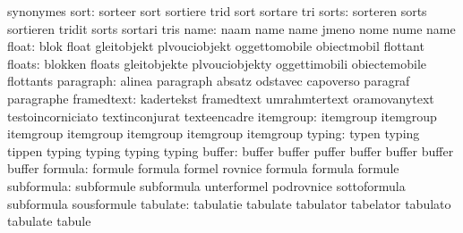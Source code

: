                            synonymes
                     sort: sorteer                   sort
                           sortiere                  trid
                           sort                      sortare
                           tri
                    sorts: sorteren                  sorts
                           sortieren                 tridit
                           sorts                     sortari
                           tris
                     name: naam                      name
                           name                      jmeno
                           nome                      nume
                           name
                    float: blok                      float
                           gleitobjekt               plvouciobjekt
                           oggettomobile             obiectmobil
                           flottant
                   floats: blokken                   floats
                           gleitobjekte              plvouciobjekty
                           oggettimobili             obiectemobile
                           flottants
                paragraph: alinea                    paragraph
                           absatz                    odstavec
                           capoverso                 paragraf
                           paragraphe
               framedtext: kadertekst                framedtext
                           umrahmtertext             oramovanytext
                           testoincorniciato         textinconjurat
                           texteencadre
                itemgroup: itemgroup                 itemgroup
                           itemgroup                 itemgroup
                           itemgroup                 itemgroup
                           itemgroup
                   typing: typen                     typing
                           tippen                    typing
                           typing                    typing
                           typing
                   buffer: buffer                    buffer
                           puffer                    buffer
                           buffer                    buffer
                           buffer
                  formula: formule                   formula
                           formel                    rovnice
                           formula                   formula
                           formule
               subformula: subformule                subformula
                           unterformel               podrovnice
                           sottoformula              subformula
                           sousformule
                 tabulate: tabulatie                 tabulate
                           tabulator                 tabelator
                           tabulato                  tabulate
                           tabule

